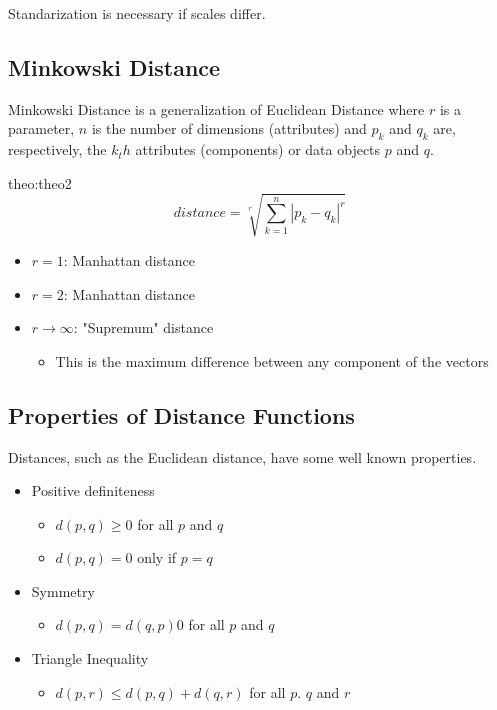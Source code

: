 Standarization is necessary if scales differ.


\subsection{Minkowski Distance}

Minkowski Distance is a generalization of Euclidean Distance where
$r$ is a parameter, $n$ is the number of dimensions (attributes) and $p_k$ and $q_k$ are, 
respectively, the $k_th$ attributes (components) or data objects $p$ and $q$.

\begin{theo}{theo:theo2}
\label{eq:minkowski-distance}
    \[
        distance = \sqrt[r]{\sum_{k=1}^{n}|p_k-q_k|^r}
    \]
\end{theo}

\begin{itemize}
    \item $r = 1$: Manhattan distance
    \item $r = 2$: Manhattan distance
    \item $r \rightarrow \infty$: "Supremum" distance
    \begin{itemize}
        \item This is the maximum difference between any component of the vectors
    \end{itemize}
\end{itemize}

\subsection{Properties of Distance Functions}
Distances, such as the Euclidean distance, have some well known properties.
\begin{itemize}
    \item Positive definiteness
    \begin{itemize}
        \item $d(p, q) \geq 0$ for all $p$ and $q$
        \item $d(p, q) = 0$ only if $p = q$
    \end{itemize}
    \item Symmetry
    \begin{itemize}
        \item $d(p, q) = d(q, p) 0$ for all $p$ and $q$
    \end{itemize}
    \item Triangle Inequality
    \begin{itemize}
        \item $d(p, r) \leq d(p, q) + d(q, r)$ for all $p$. $q$ and $r$
    \end{itemize}
\end{itemize}

